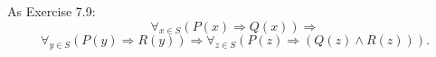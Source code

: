 \begin{problem}{7.10}
    As Exercise 7.9:
    $$\forall_{x \in S}(P(x) \Rightarrow Q(x)) \Rightarrow$$
    $$\forall_{y \in S}(P(y) \Rightarrow R(y)) \Rightarrow \forall_{z \in S}(P(z) \Rightarrow (Q(z) \land R(z))).$$
\end{problem}